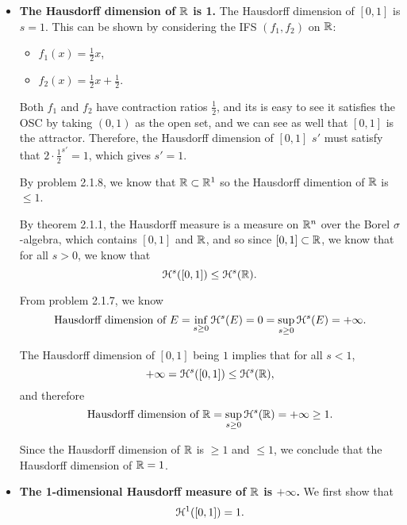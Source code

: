 \begin{itemize}
    \item \textbf{The Hausdorff dimension of \(\mathbb{R}\) is 1.} The Hausdorff dimension of \([0, 1]\) is \(s = 1\). This can be shown by considering the IFS \((f_1, f_2)\) on \(\mathbb{R}\):
    \begin{itemize}
        \item \(f_1(x) = \frac{1}{2}x\),
        \item \(f_2(x) = \frac{1}{2} x + \frac{1}{2}\).
    \end{itemize}
    
    Both \(f_1\) and \(f_2\) have contraction ratios \(\frac{1}{2}\), and its is easy to see it satisfies the OSC by taking \((0, 1)\) as the open set, and we can see as well that \([0, 1]\) is the attractor. Therefore, the Hausdorff dimension of \([0, 1]\) \(s'\) must satisfy that \(2 \cdot \frac{1}{2}^{s'} = 1\), which gives \(s' = 1\).
    
    By problem 2.1.8, we know that \(\mathbb{R} \subset \mathbb{R}^1\) so the Hausdorff dimention of \(\mathbb{R}\) is \(\leq 1\).
    
    By theorem 2.1.1, the Hausdorff measure is a measure on \(\mathbb{R}^n\) over the Borel \(\sigma\)-algebra, which contains \([0, 1]\) and \(\mathbb{R}\), and so since \([0, 1] \subset \mathbb{R}\), we know that for all \(s > 0\), we know that
    \[
    \mathcal{H}^s([0, 1]) \leq \mathcal{H}^s(\mathbb{R}).
    \]
    
    From problem 2.1.7, we know
    \[
    \text{Hausdorff dimension of } E = \inf_{s \geq 0}{\mathcal{H}^s(E) = 0} = \sup_{s \geq 0}{\mathcal{H}^s(E) = +\infty}.
    \]
    
    The Hausdorff dimension of \([0, 1]\) being \(1\) implies that for all \(s < 1\),
    \[
    +\infty = \mathcal{H}^s([0, 1]) \leq \mathcal{H}^s(\mathbb{R}),
    \]
    and therefore 
    \[
    \text{Hausdorff dimension of } \mathbb{R} = \sup_{s \geq 0}{\mathcal{H}^s(\mathbb{R}) = +\infty} \geq 1.
    \]
    
    Since the Hausdorff dimension of \(\mathbb{R}\) is \(\geq 1\) and \(\leq 1\), we conclude that the Hausdorff dimension of \(\mathbb{R} = 1\).

    \item \textbf{The 1-dimensional Hausdorff measure of \(\mathbb{R}\) is \(+\infty\).} We first show that
    \[\mathcal{H}^1 ([0, 1]) = 1.\]
    

\end{itemize}
